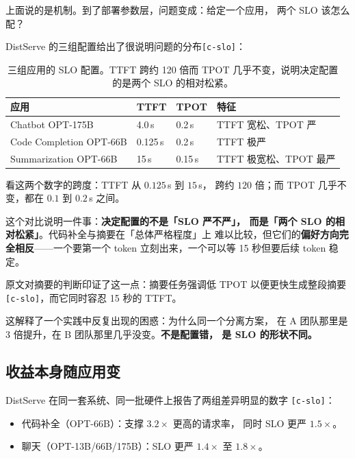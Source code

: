 上面说的是机制。到了部署参数层，问题变成：给定一个应用，
两个 SLO 该怎么配？

DistServe 的三组配置给出了很说明问题的分布\texttt{[c-slo]}：

\begin{table}[t]
\centering
\caption{三组应用的 SLO 配置。TTFT 跨约 120 倍而 TPOT 几乎不变，说明决定配置的是两个 SLO 的相对松紧。}
\label{tab:slo}
\small
\setlength{\tabcolsep}{8pt}
\begin{tabular}{@{}p{3.35cm}p{2.13cm}p{2.13cm}p{7.6cm}@{}}
\toprule
应用 & TTFT & TPOT & 特征 \\
\midrule
Chatbot OPT-175B & 4.0\,s & 0.2\,s & TTFT 宽松、TPOT 严 \\
Code Completion OPT-66B & 0.125\,s & 0.2\,s & TTFT 极严 \\
Summarization OPT-66B & 15\,s & 0.15\,s & TTFT 极宽松、TPOT 最严 \\
\bottomrule
\end{tabular}
\end{table}

\noindent 看这两个数字的跨度：TTFT 从 $0.125$\,s 到 $15$\,s，
跨约 $120$ 倍；而 TPOT 几乎不变，都在 $0.1$ 到 $0.2$\,s 之间。

\noindent 这个对比说明一件事：\textbf{决定配置的不是「SLO 严不严」，
而是「两个 SLO 的相对松紧」}。代码补全与摘要在「总体严格程度」上
难以比较，但它们的\textbf{偏好方向完全相反}——一个要第一个 token
立刻出来，一个可以等 15 秒但要后续 token 稳定。

\noindent 原文对摘要的判断印证了这一点：摘要任务强调低 TPOT
以便更快生成整段摘要\texttt{[c-slo]}，而它同时容忍 15 秒的 TTFT。

\noindent 这解释了一个实践中反复出现的困惑：为什么同一个分离方案，
在 A 团队那里是 3 倍提升，在 B 团队那里几乎没变。\textbf{不是配置错，
是 SLO 的形状不同。}

\subsection{收益本身随应用变}

DistServe 在同一套系统、同一批硬件上报告了两组差异明显的数字
\texttt{[c-slo]}：

\begin{itemize}[leftmargin=1.3em,itemsep=1.5pt,topsep=2pt]
  \item 代码补全（OPT-66B）：支撑 $3.2\times$ 更高的请求率，
        同时 SLO 更严 $1.5\times$。
  \item 聊天（OPT-13B/66B/175B）：SLO 更严 $1.4\times$ 至 $1.8\times$。
\end{itemize}


